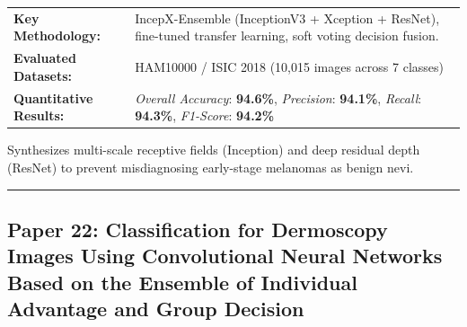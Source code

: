 \documentclass[10pt,a4paper]{article}
\begin{document}
\vspace{4pt}
\begin{tabularx}{\linewidth}{p{3.2cm}X}
\toprule
\textbf{Key Methodology:} & IncepX-Ensemble (InceptionV3 + Xception + ResNet), fine-tuned transfer learning, soft voting decision fusion. \\
\textbf{Evaluated Datasets:} & HAM10000 / ISIC 2018 (10,015 images across 7 classes) \\
\textbf{Quantitative Results:} & \textit{Overall Accuracy}: \textbf{94.6\%}, \textit{Precision}: \textbf{94.1\%}, \textit{Recall}: \textbf{94.3\%}, \textit{F1-Score}: \textbf{94.2\%} \\
\bottomrule
\end{tabularx}
\vspace{4pt}
\begin{tcolorbox}[utilitybox,title=Clinical Utility and Real-World Impact]
Synthesizes multi-scale receptive fields (Inception) and deep residual depth (ResNet) to prevent misdiagnosing early-stage melanomas as benign nevi.
\end{tcolorbox}
\vspace{12pt}
\hrule
\vspace{12pt}
\subsection*{Paper 22: Classification for Dermoscopy Images Using Convolutional Neural Networks Based on the Ensemble of Individual Advantage and Group Decision}
\end{document}
